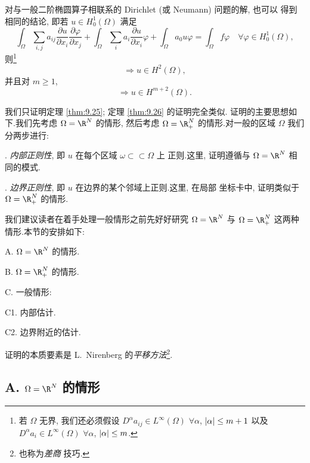 \begin{remark}
\label{rem:9.24}
对与一般二阶椭圆算子相联系的 Dirichlet (或 Neumann) 问题的解, 也可以
得到相同的结论, 即若 $u\in H_0^1(\Omega)$ 满足
\begin{equation*}
\int_\Omega\sum_{i,j}a_{ij}\frac{\partial u}{\partial x_i}
\frac{\partial\varphi}{\partial x_j}+\int_\Omega\sum_ia_i
\frac{\partial u}{\partial x_i}\varphi+\int_\Omega a_0u\varphi
=\int_\Omega f\varphi\quad\forall\varphi\in H_0^1(\Omega),
\end{equation*}
则\footnote{若 $\Omega$ 无界, 我们还必须假设
$D^\alpha a_{ij}\in L^\infty(\Omega)$ $\forall\alpha$, $\left|\alpha\right|\le m+1$
以及 $D^\alpha a_i\in L^\infty(\Omega)$ $\forall\alpha$, $\left|\alpha\right|\le m$.}
\begin{equation*}
[f\in L^2(\Omega),\ a_{ij}\in C^1(\Omega)\ \text{且}\ a_i\in C(\Omega)]
\Rightarrow u\in H^2(\Omega),
\end{equation*}
并且对 $m\ge1$,
\begin{equation*}
[f\in H^m(\Omega),\ a_{ij}\in C^{m+1}(\Omega)\ \text{且}\ a_i\in C^m(\Omega)]
\Rightarrow u\in H^{m+2}(\Omega).
\end{equation*}
\end{remark}

我们只证明定理  \ref{thm:9.25}; 定理  \ref{thm:9.26} 的证明完全类似.
证明的主要思想如下.我们先考虑 $\Omega=\R^N$ 的情形, 然后考虑
$\Omega=\R^N_+$ 的情形.对一般的区域 $\Omega$ 我们分两步进行:

. \emph{内部正则性}, 即 $u$ 在每个区域 $\omega\subset\subset\Omega$ 上
正则.这里, 证明遵循与 $\Omega=\R^N$ 相同的模式.

. \emph{边界正则性}, 即 $u$ 在边界的某个邻域上正则.这里, 在局部
坐标卡中, 证明类似于 $\Omega=\R^N_+$ 的情形.

我们建议读者在着手处理一般情形之前先好好研究 $\Omega=\R^N$ 与
$\Omega=\R^N_+$ 这两种情形.本节的安排如下:

\noindent A. $\Omega=\R^N$ 的情形.

\noindent B. $\Omega=\R^N_+$ 的情形.

\noindent C. 一般情形:

\noindent C1. 内部估计.

\noindent C2. 边界附近的估计.

证明的本质要素是 L.~Nirenberg 的\emph{平移方法}\footnote{也称为\emph{差商}
技巧.}.

\subsection*{A. $\Omega=\R^N$ 的情形}

